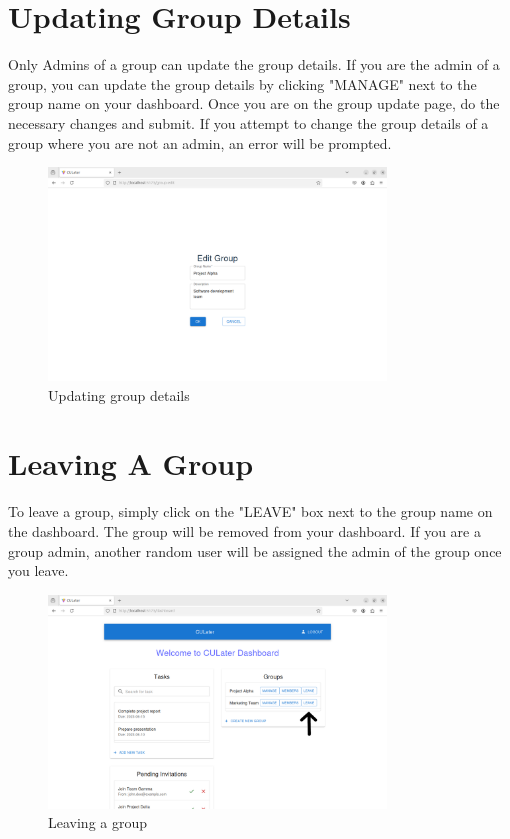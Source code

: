 \documentclass{scrreprt}
\begin{document}
\chapter{Updating Group Details}

Only Admins of a group can update the group details. If you are the admin of a group, you can update the group details by clicking "MANAGE" next to the group name on your dashboard. Once you are on the group update page, do the necessary changes and submit. If you attempt to change the group details of a group where you are not an admin, an error will be prompted.\\
\begin{figure}[htbp]
        \centering
        \includegraphics[width=0.8\textwidth]{group_update.png}
	\caption{Updating group details}
	\label{fig:my_label}
\end{figure}

\chapter{Leaving A Group}

To leave a group, simply click on the "LEAVE" box next to the group name on the dashboard. The group will be removed from your dashboard. If you are a group admin, another random user will be assigned the admin of the group once you leave.\\
\begin{figure}[htbp]
        \centering
        \includegraphics[width=0.8\textwidth]{leave_group.png}
	\caption{Leaving a group}
	\label{fig:my_label}
\end{figure}
\end{document}
